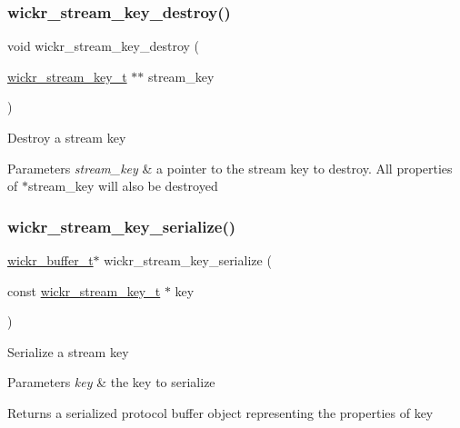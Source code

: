 \subsubsection{\texorpdfstring{wickr\+\_\+stream\+\_\+key\+\_\+destroy()}{wickr\_stream\_key\_destroy()}}
{\footnotesize\ttfamily void wickr\+\_\+stream\+\_\+key\+\_\+destroy (\begin{DoxyParamCaption}\item[{\hyperlink{structwickr__stream__key}{wickr\+\_\+stream\+\_\+key\+\_\+t} $\ast$$\ast$}]{stream\+\_\+key }\end{DoxyParamCaption})}

Destroy a stream key


\begin{DoxyParams}{Parameters}
{\em stream\+\_\+key} & a pointer to the stream key to destroy. All properties of \textquotesingle{}$\ast$stream\+\_\+key\textquotesingle{} will also be destroyed \\
\hline
\end{DoxyParams}
\mbox{\label{group__wickr__stream__key_gae1540c98a88e2f62e96fb2ee209e2290}} 
\subsubsection{\texorpdfstring{wickr\+\_\+stream\+\_\+key\+\_\+serialize()}{wickr\_stream\_key\_serialize()}}
{\footnotesize\ttfamily \hyperlink{structwickr__buffer}{wickr\+\_\+buffer\+\_\+t}$\ast$ wickr\+\_\+stream\+\_\+key\+\_\+serialize (\begin{DoxyParamCaption}\item[{const \hyperlink{structwickr__stream__key}{wickr\+\_\+stream\+\_\+key\+\_\+t} $\ast$}]{key }\end{DoxyParamCaption})}

Serialize a stream key


\begin{DoxyParams}{Parameters}
{\em key} & the key to serialize \\
\hline
\end{DoxyParams}
\begin{DoxyReturn}{Returns}
a serialized protocol buffer object representing the properties of \textquotesingle{}key\textquotesingle{} 
\end{DoxyReturn}
